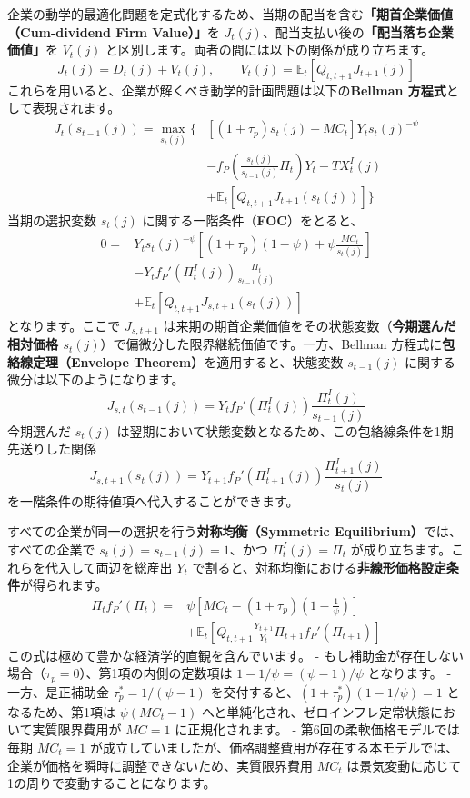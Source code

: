 \documentclass[
  japanese,
  lualatex,
  ja=standard,
  12pt,
  a4paper]{ltjsarticle}
\begin{document}
企業の動学的最適化問題を定式化するため、当期の配当を含む\textbf{「期首企業価値（Cum-dividend
Firm Value）」}を
\(J_t(j)\)、配当支払い後の\textbf{「配当落ち企業価値」}を \(V_t(j)\)
と区別します。両者の間には以下の関係が成り立ちます。 \[
J_t(j)=D_t(j)+V_t(j),
\qquad
V_t(j)=\mathbb{E}_t\left[Q_{t,t+1}J_{t+1}(j)\right]
\] これらを用いると、企業が解くべき動学的計画問題は以下の\textbf{Bellman
方程式}として表現されます。 \[
\begin{aligned}
J_t(s_{t-1}(j))
=\max_{s_t(j)}\Bigg\{
&\left[(1+\tau_p)s_t(j)-MC_t\right]
Y_ts_t(j)^{-\psi}\\
&-f_P\left(
\frac{s_t(j)}{s_{t-1}(j)}\Pi_t
\right)Y_t
-TX_t^I(j)\\
&+\mathbb{E}_t\left[
Q_{t,t+1}J_{t+1}(s_t(j))
\right]
\Bigg\}
\end{aligned}
\] 当期の選択変数 \(s_t(j)\) に関する一階条件（\textbf{FOC}）をとると、
\[
\begin{aligned}
0={}&
Y_ts_t(j)^{-\psi}
\left[
(1+\tau_p)(1-\psi)
+\psi\frac{MC_t}{s_t(j)}
\right]\\
&-Y_tf_P'\left(\Pi_t^I(j)\right)
\frac{\Pi_t}{s_{t-1}(j)}\\
&+\mathbb{E}_t\left[
Q_{t,t+1}J_{s,t+1}(s_t(j))
\right]
\end{aligned}
\] となります。ここで \(J_{s,t+1}\)
は来期の期首企業価値をその状態変数（\textbf{今期選んだ相対価格
\(s_t(j)\)}）で偏微分した限界継続価値です。一方、Bellman
方程式に\textbf{包絡線定理（Envelope Theorem）}を適用すると、状態変数
\(s_{t-1}(j)\) に関する微分は以下のようになります。 \[
J_{s,t}(s_{t-1}(j))
=
Y_t f_P'\left(\Pi_t^I(j)\right)
\frac{\Pi_t^I(j)}{s_{t-1}(j)}
\] 今期選んだ \(s_t(j)\)
は翌期において状態変数となるため、この包絡線条件を1期先送りした関係 \[
J_{s,t+1}(s_t(j))
=
Y_{t+1} f_P'\left(\Pi_{t+1}^I(j)\right)
\frac{\Pi_{t+1}^I(j)}{s_t(j)}
\] を一階条件の期待値項へ代入することができます。

すべての企業が同一の選択を行う\textbf{対称均衡（Symmetric
Equilibrium）}では、すべての企業で \(s_t(j)=s_{t-1}(j)=1\)、かつ
\(\Pi_t^I(j)=\Pi_t\) が成り立ちます。これらを代入して両辺を総産出
\(Y_t\)
で割ると、対称均衡における\textbf{非線形価格設定条件}が得られます。 \[
\begin{aligned}
\Pi_tf_P'(\Pi_t)={}&
\psi\left[
MC_t-(1+\tau_p)\left(1-\frac{1}{\psi}\right)
\right]\\
&+\mathbb{E}_t\left[
Q_{t,t+1}\frac{Y_{t+1}}{Y_t}
\Pi_{t+1}f_P'(\Pi_{t+1})
\right]
\end{aligned}
\] この式は極めて豊かな経済学的直観を含んでいます。 -
もし補助金が存在しない場合（\(\tau_p=0\)）、第1項の内側の定数項は
\(1-1/\psi = (\psi-1)/\psi\) となります。 - 一方、是正補助金
\(\tau_p^* = 1/(\psi-1)\) を交付すると、\((1+\tau_p^*)(1-1/\psi)=1\)
となるため、第1項は \(\psi(MC_t - 1)\)
へと単純化され、ゼロインフレ定常状態において実質限界費用が \(MC=1\)
に正規化されます。 - 第6回の柔軟価格モデルでは毎期 \(MC_t=1\)
が成立していましたが、価格調整費用が存在する本モデルでは、企業が価格を瞬時に調整できないため、実質限界費用
\(MC_t\) は景気変動に応じて1の周りで変動することになります。
\end{document}
